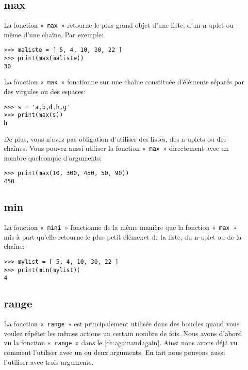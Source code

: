 \subsection*{max}

La fonction «~\texttt{max}~» retourne le plus grand objet d'une liste,  d'un n-uplet ou même d'une chaîne. Par exemple:

\begin{Verbatim}[frame=single,rulecolor=\color{gray}]
>>> maliste = [ 5, 4, 10, 30, 22 ]
>>> print(max(maliste))
30
\end{Verbatim}

La fonction «~\texttt{max}~» fonctionne sur une chaîne constituée d'éléments séparés par des virgules ou des espaces:
\begin{Verbatim}[frame=single,rulecolor=\color{gray}]
>>> s = 'a,b,d,h,g'
>>> print(max(s))
h
\end{Verbatim}

De plus, vous n'avez pas obligation d'utiliser des listes, des n-uplets ou des chaînes. Vous pouvez aussi utiliser la fonction «~\texttt{max}~» directement avec un nombre quelconque d'arguments:
\begin{Verbatim}[frame=single,rulecolor=\color{gray}]
>>> print(max(10, 300, 450, 50, 90))
450
\end{Verbatim}

\subsection*{min}
La fonction «~\texttt{mini}~» fonctionne de la même manière que la fonction «~\texttt{max}~» mis à part qu'elle retourne le plus petit élémenet de la liste, du n-uplet ou de la chaîne:
\begin{Verbatim}[frame=single,rulecolor=\color{gray}]
>>> mylist = [ 5, 4, 10, 30, 22 ]
>>> print(min(mylist))
4
\end{Verbatim}

\subsection*{range}

La fonction «~\texttt{range}~» est principalement utilisée dans des boucles quand vous voulez répéter les mêmes actions un certain nombre de fois.  Nous avons d'abord vu la fonction «~\texttt{range}~» dans le \autoref{ch:againandagain}. Ainsi nous avons déjà vu comment l'utiliser avec un ou deux arguments. En fait nous pouvons aussi l'utiliser avec trois arguments.


